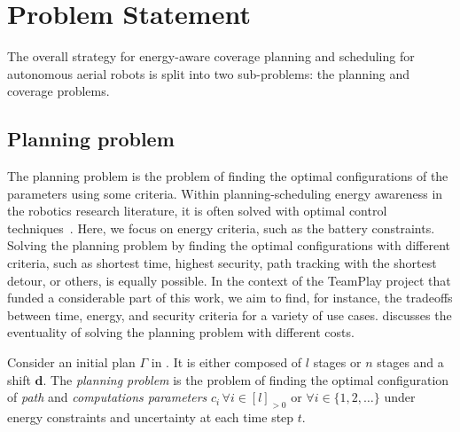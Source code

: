 \section{Problem Statement}
\label{sec:2pbs}

The overall strategy for energy-aware coverage planning and scheduling for autonomous aerial robots is split into two sub-problems: the planning and coverage problems.  

\subsection{Planning problem}
\label{sec:plan-pb}

The planning problem is the problem of finding the optimal configurations of the parameters using some criteria. Within planning-scheduling energy awareness in the robotics research literature, it is often solved with optimal control techniques~\citep{zhang2007low,ondruska2015scheduled,lahijanian2018resource,brateman2006energy}. Here, we focus on energy criteria, such as the battery constraints. %
Solving the planning problem by finding the optimal configurations with different criteria, such as shortest time, highest security, path tracking with the shortest detour, or others, is equally possible. In the context of the TeamPlay project that funded a considerable part of this work, we aim to find, for instance, the tradeoffs between time, energy, and security criteria for a variety of use cases.  discusses the eventuality of solving the planning problem with different costs. 

\begin{pb}
  \label{pb}
  Consider an initial plan $\Gamma$ in . It is either composed of $l$ stages or $n$ stages and a shift $\mathbf{d}$. The \emph{planning problem} is the problem of finding the optimal configuration of \emph{path} and \emph{computations parameters} $c_i\,\forall i\in[l]_{>0}$ or $\forall i\in\{1,2,\dots\}$ under energy constraints and uncertainty at each time step $t$.
\end{pb}    

